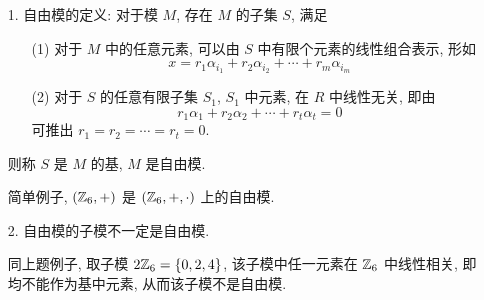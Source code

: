 \begin{solution}
	\begin{itemize}
		\item[1.]自由模的定义: 对于模 $M$, 存在 $M$ 的子集 $S$, 满足
		\begin{itemize}
			\item[(1)] 对于 $M$ 中的任意元素, 可以由 $S$ 中有限个元素的线性组合表示, 形如 $$x=r_1\alpha_{i_1}+r_2\alpha_{i_2}+\cdots+r_m\alpha_{i_m}$$
			\item[(2)] 对于 $S$ 的任意有限子集 $S_1$, $S_1$ 中元素, 在 $R$ 中线性无关, 即由 $$r_1\alpha_1+r_2\alpha_2+\cdots+r_t\alpha_t=0$$ 可推出 $r_1=r_2=\cdots=r_t=0$.
		\end{itemize}
		则称 $S$ 是 $M$ 的基, $M$ 是自由模.
		
		简单例子, $(\mathbb Z_6,+)$ 是 $(\mathbb Z_6,+,\cdot)$ 上的自由模.
		
		\item[2.] 自由模的子模不一定是自由模.
		
		同上题例子, 取子模 $2\mathbb Z_6=\{0,2,4\}$, 该子模中任一元素在 $\mathbb Z_6$ 中线性相关, 即均不能作为基中元素, 从而该子模不是自由模.
	\end{itemize}
\end{solution}

\problem[题目 4]

